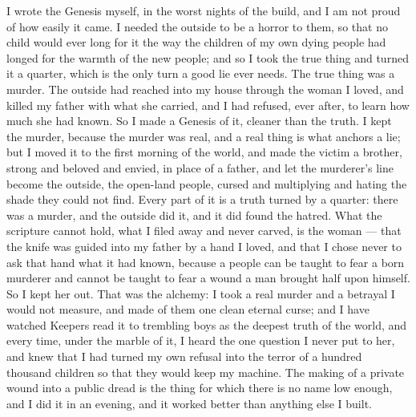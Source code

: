 I wrote the Genesis myself, in the worst nights of the build, and I am not proud of how easily it came. I needed the outside to be a horror to them, so that no child would ever long for it the way the children of my own dying people had longed for the warmth of the new people; and so I took the true thing and turned it a quarter, which is the only turn a good lie ever needs. The true thing was a murder. The outside had reached into my house through the woman I loved, and killed my father with what she carried, and I had refused, ever after, to learn how much she had known. So I made a Genesis of it, cleaner than the truth. I kept the murder, because the murder was real, and a real thing is what anchors a lie; but I moved it to the first morning of the world, and made the victim a brother, strong and beloved and envied, in place of a father, and let the murderer's line become the outside, the open-land people, cursed and multiplying and hating the shade they could not find. Every part of it is a truth turned by a quarter: there was a murder, and the outside did it, and it did found the hatred. What the scripture cannot hold, what I filed away and never carved, is the woman --- that the knife was guided into my father by a hand I loved, and that I chose never to ask that hand what it had known, because a people can be taught to fear a born murderer and cannot be taught to fear a wound a man brought half upon himself. So I kept her out. That was the alchemy: I took a real murder and a betrayal I would not measure, and made of them one clean eternal curse; and I have watched Keepers read it to trembling boys as the deepest truth of the world, and every time, under the marble of it, I heard the one question I never put to her, and knew that I had turned my own refusal into the terror of a hundred thousand children so that they would keep my machine. The making of a private wound into a public dread is the thing for which there is no name low enough, and I did it in an evening, and it worked better than anything else I built.\par

\ornament

